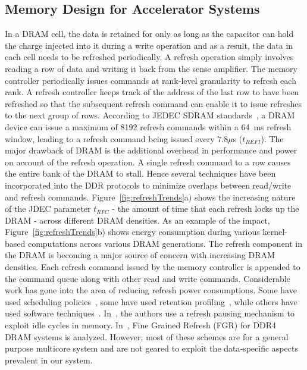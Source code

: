 \subsection{Memory Design for Accelerator Systems}

In a DRAM cell, the data is retained for only as long as the capacitor can hold the charge injected into it during a write operation and as a result, the data in each cell needs to be refreshed periodically. A refresh operation simply involves reading a row of data and writing it back from the sense amplifier. The memory controller periodically issues commands at rank-level granularity to refresh each rank. A refresh controller keeps track of the address of the last row to have been refreshed so that the subsequent refresh command can enable it to issue refreshes to the next group of rows.
According to JEDEC SDRAM standards~\cite{jedec-sdram-standards}, a DRAM device can issue a maximum of 8192 refresh commands within a 64~ms refresh window, leading to a refresh command being issued every 7.8$\mu$s ($t_{REFI}$). The major drawback of DRAM is the additional overhead in performance and power on account of the refresh operation. A single refresh command to a row causes the entire bank of the DRAM to stall. Hence several techniques have been incorporated into the DDR protocols to minimize overlaps between read/write and refresh commands. Figure~\ref{fig:refreshTrends}a) shows the increasing nature of the JDEC parameter $t_{RFC}$ - the amount of time that each refresh locks up the DRAM - across different DRAM densities. As an example of the impact, Figure~\ref{fig:refreshTrends}b) shows energy consumption during various kernel-based computations across various DRAM generations. The refresh component in the DRAM is becoming a major source of concern with increasing DRAM densities. Each refresh command issued by the memory controller is appended to the command queue along with other read and write commands.  
Considerable work has gone into the area of reducing refresh power consumptions. Some have used scheduling policies~\cite{Stuecheli2010}, some have used retention profiling~\cite{Liu2012}, while others have used software techniques~\cite{Liu2012}. In~\cite{Nair2013}, the authors use a refresh pausing mechanism to exploit idle cycles in memory. In~\cite{Mukundan2013}, Fine Grained Refresh (FGR) for DDR4 DRAM systems is analyzed. 
However, most of these schemes are for a general purpose multicore system and are not geared to exploit the data-specific aspects prevalent in our system. 

